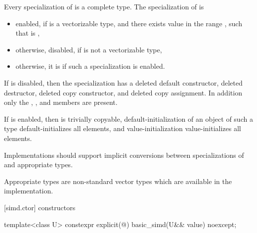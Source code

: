 \pnum
Every specialization of  is a complete type.
The specialization of  is
\begin{itemize}
 \item
    enabled, if  is a vectorizable type, and there exists value
     in the range , such that  is
    ,
 \item
   otherwise, disabled, if  is not a vectorizable type,
 \item
   otherwise, it is  if such a specialization is enabled.
\end{itemize}

If  is disabled, then the specialization has a
deleted default constructor, deleted destructor, deleted copy constructor, and
deleted copy assignment.
In addition only the , , and
 members are present.

If  is enabled, then  is
trivially copyable, default-initialization of an object of such a type
default-initializes all elements, and value-initialization value-initializes
all elements.

\pnum
\recommended
Implementations should support implicit conversions between specializations of
 and appropriate  types.
\begin{note}
Appropriate types are non-standard vector types which are available in the
implementation.
\end{note}

[simd.ctor]{ constructors}

\begin{itemdecl}
template<class U> constexpr explicit(@\seebelow@) basic_simd(U&& value) noexcept;
\end{itemdecl}


